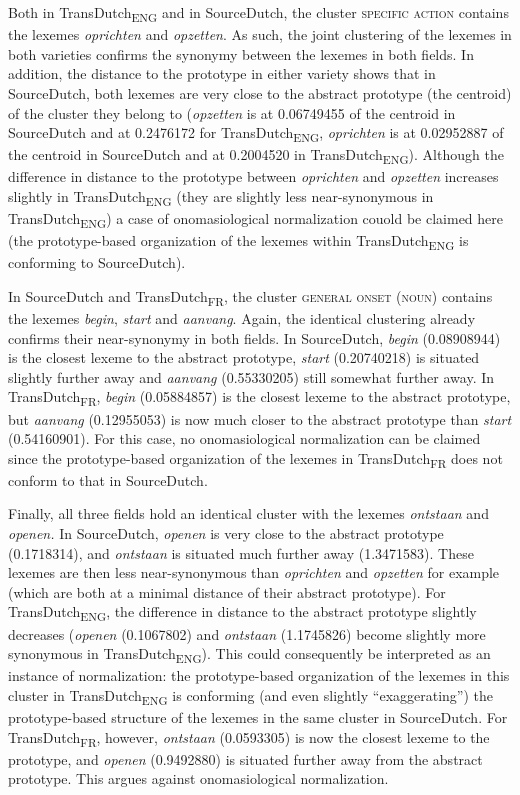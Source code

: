 Both in TransDutch\textsubscript{ENG} and in SourceDutch, the cluster {\textsc{specific}} \textsc{action} contains the lexemes \textit{oprichten} and \textit{opzetten}. As such, the joint clustering of the lexemes in both varieties confirms the synonymy between the lexemes in both fields. In addition, the distance to the prototype in either variety shows that in SourceDutch, both lexemes are very close to the abstract prototype (the centroid) of the cluster they belong to (\textit{opzetten} is at 0.06749455 of the centroid in SourceDutch and at 0.2476172 for TransDutch\textsubscript{ENG}, \textit{oprichten} is at 0.02952887 of the centroid in SourceDutch and at 0.2004520 in TransDutch\textsubscript{ENG}). Although the difference in distance to the prototype between \textit{oprichten} and \textit{opzetten} increases slightly in TransDutch\textsubscript{ENG} (they are slightly less near-synonymous in TransDutch\textsubscript{ENG})\textsubscript{} a case of onomasiological normalization couold be claimed here (the prototype-based organization of the lexemes within TransDutch\textsubscript{ENG} is conforming to SourceDutch).

In SourceDutch and TransDutch\textsubscript{FR}, the cluster \textsc{general onset} (\textsc{noun}) contains the lexemes \textit{begin}, \textit{start} and \textit{aanvang}. Again, the identical clustering already confirms their near-synonymy in both fields. In SourceDutch, \textit{begin} (0.08908944) is the closest lexeme to the abstract prototype, \textit{start} (0.20740218) is situated slightly further away and \textit{aanvang} (0.55330205) still somewhat further away. In TransDutch\textsubscript{FR}, \textit{begin} (0.05884857) is the closest lexeme to the abstract prototype, but \textit{aanvang} (0.12955053) is now much closer to the abstract prototype than \textit{start} (0.54160901). For this case, no onomasiological normalization can be claimed since the prototype-based organization of the lexemes in TransDutch\textsubscript{FR} does not conform to that in SourceDutch.

Finally, all three fields hold an identical cluster with the lexemes \textit{ontstaan} and \textit{openen.} In SourceDutch, \textit{openen} is very close to the abstract prototype (0.1718314), and \textit{ontstaan} is situated much further away (1.3471583). These lexemes are then less near-synonymous than \textit{oprichten} and \textit{opzetten} for example (which are both at a minimal distance of their abstract prototype). For TransDutch\textsubscript{ENG}, the difference in distance to the abstract prototype slightly decreases (\textit{openen} (0.1067802) and \textit{ontstaan} (1.1745826) become slightly more synonymous in TransDutch\textsubscript{ENG}). This could consequently be interpreted as an instance of normalization: the pro\-to\-type-based organization of the lexemes in this cluster in TransDutch\textsubscript{ENG} is conforming (and even slightly ``exaggerating'') the prototype-based structure of the lexemes in the same cluster in SourceDutch. For TransDutch\textsubscript{FR}, however, \textit{ontstaan} (0.0593305) is now the closest lexeme to the prototype, and \textit{openen} (0.9492880) is situated further away from the abstract prototype. This argues against onomasiological normalization.

